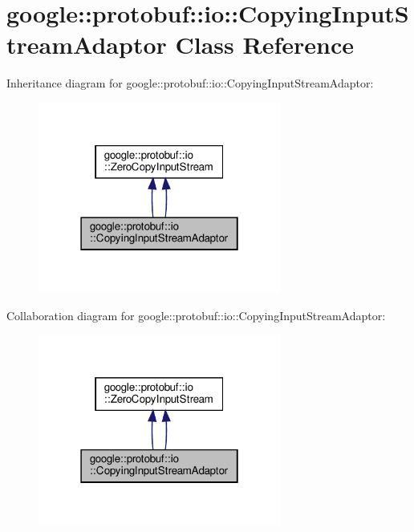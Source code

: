 \hypertarget{classgoogle_1_1protobuf_1_1io_1_1CopyingInputStreamAdaptor}{}\section{google\+:\+:protobuf\+:\+:io\+:\+:Copying\+Input\+Stream\+Adaptor Class Reference}
\label{classgoogle_1_1protobuf_1_1io_1_1CopyingInputStreamAdaptor}


Inheritance diagram for google\+:\+:protobuf\+:\+:io\+:\+:Copying\+Input\+Stream\+Adaptor\+:
\nopagebreak
\begin{figure}[H]
\begin{center}
\leavevmode
\includegraphics[width=226pt]{classgoogle_1_1protobuf_1_1io_1_1CopyingInputStreamAdaptor__inherit__graph}
\end{center}
\end{figure}


Collaboration diagram for google\+:\+:protobuf\+:\+:io\+:\+:Copying\+Input\+Stream\+Adaptor\+:
\nopagebreak
\begin{figure}[H]
\begin{center}
\leavevmode
\includegraphics[width=226pt]{classgoogle_1_1protobuf_1_1io_1_1CopyingInputStreamAdaptor__coll__graph}
\end{center}
\end{figure}
